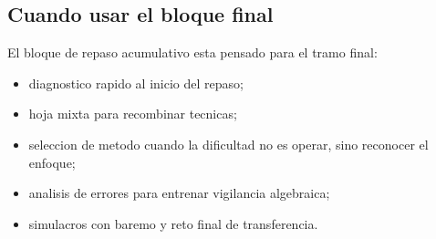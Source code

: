\subsection*{Cuando usar el bloque final}
El bloque de repaso acumulativo esta pensado para el tramo final:
\begin{itemize}
  \item diagnostico rapido al inicio del repaso;
  \item hoja mixta para recombinar tecnicas;
  \item seleccion de metodo cuando la dificultad no es operar, sino reconocer el enfoque;
  \item analisis de errores para entrenar vigilancia algebraica;
  \item simulacros con baremo y reto final de transferencia.
\end{itemize}
